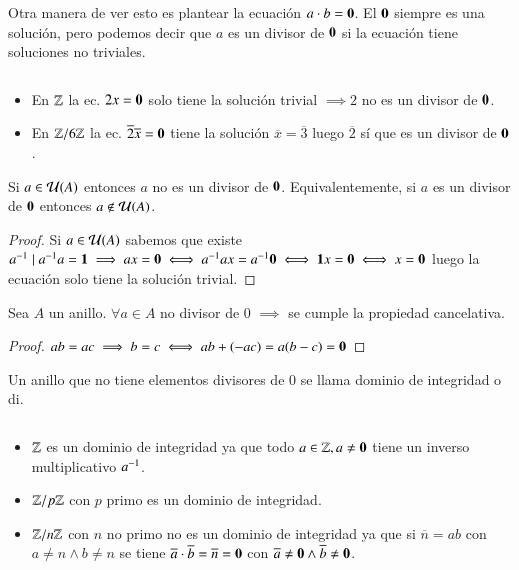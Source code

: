 Otra manera de ver esto es plantear la ecuación $a \cdot b = \mathbf{0}$. El $\mathbf{0}$ siempre es una solución, pero podemos decir que $a$ es un divisor de $\mathbf{0}$ si la ecuación tiene soluciones no triviales.

\begin{ej}$ $\newline
	\begin{itemize}
		\item En $\mathbb{Z}$ la ec. $2x = \mathbf{0}$ solo tiene la solución trivial $\implies 2$ no es un divisor de $\mathbf{0}$.
		\item En $\mathbb{Z}/6\mathbb{Z}$ la ec. $\overline{2}\overline{x} = \mathbf{0}$ tiene la solución $\overline{x} = \overline{3}$ luego $\overline{2}$ sí que es un divisor de $\mathbf{0}$.
	\end{itemize}
\end{ej}

\begin{pro}
	Si $a \in \mathcal{U}(A)$ entonces $a$ no es un divisor de $\mathbf{0}$. Equivalentemente, si $a$ es un divisor de $\mathbf{0}$ entonces $a \notin \mathcal{U}(A)$.
\end{pro}

\begin{proof}
	Si $a \in \mathcal{U}(A)$ sabemos que existe $a^{-1} \mid a^{-1}a = \mathbf{1} \implies ax = \mathbf{0} \iff a^{-1}ax = a^{-1} \mathbf{0} \iff \mathbf{1} x = \mathbf{0} \iff x = \mathbf{0}$ luego la ecuación solo tiene la solución trivial.
\end{proof}

\begin{pro}
	Sea $A$ un anillo. $\forall a \in A$ no divisor de 0 $\implies$ se cumple la propiedad cancelativa.
\end{pro}

\begin{proof}
	$ab = ac \implies b = c \iff ab + (-ac) = a(b -c) = \mathbf{0}$
\end{proof}

\begin{dfn}
	\label{dfn:dominiointegridad}
	Un anillo que no tiene elementos divisores de 0 se llama dominio de integridad o \gls{di}.
\end{dfn}

\begin{ej}$ $\newline
	\begin{itemize}
		\item $\mathbb{Z}$ es un dominio de integridad ya que todo $a \in \mathbb{Z}, a \neq \mathbf{0}$ tiene un inverso multiplicativo $a^{-1}$.
		\item $\mathbb{Z}/p\mathbb{Z}$ con $p$ primo es un dominio de integridad.
		\item $\mathbb{Z}/n\mathbb{Z}$ con $n$ no primo no es un dominio de integridad ya que si $\overline n = ab$ con $a \neq n \land b \neq n$ se tiene $\overline{a} \cdot \overline{b} = \overline{n} = \mathbf{0}$ con $\overline{a} \neq \mathbf{0} \land \overline{b} \neq \mathbf{0}$.
	\end{itemize}
\end{ej}


